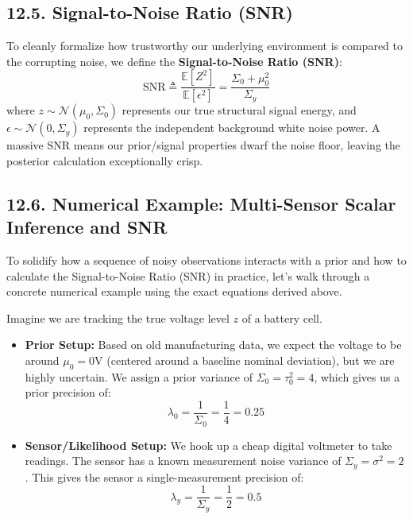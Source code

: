 \documentclass{article}
\begin{document}
\subsection*{12.5. Signal-to-Noise Ratio (SNR)}
To cleanly formalize how trustworthy our underlying environment is compared to the corrupting noise, we define the \textbf{Signal-to-Noise Ratio (SNR)}:
\begin{equation}
\text{SNR} \triangleq \frac{\mathbb{E}[Z^2]}{\mathbb{E}[\epsilon^2]} = \frac{\Sigma_0 + \mu_0^2}{\Sigma_y} \tag{51}
\end{equation}
where $z \sim \mathcal{N}(\mu_0, \Sigma_0)$ represents our true structural signal energy, and $\epsilon \sim \mathcal{N}(0, \Sigma_y)$ represents the independent background white noise power. A massive SNR means our prior/signal properties dwarf the noise floor, leaving the posterior calculation exceptionally crisp.

\subsection*{12.6. Numerical Example: Multi-Sensor Scalar Inference and SNR}

To solidify how a sequence of noisy observations interacts with a prior and how to calculate the Signal-to-Noise Ratio (SNR) in practice, let's walk through a concrete numerical example using the exact equations derived above.

Imagine we are tracking the true voltage level $z$ of a battery cell. 
\begin{itemize}
    \item \textbf{Prior Setup:} Based on old manufacturing data, we expect the voltage to be around $\mu_0 = 0\text{V}$ (centered around a baseline nominal deviation), but we are highly uncertain. We assign a prior variance of $\Sigma_0 = \tau_0^2 = 4$, which gives us a prior precision of:
    \begin{equation*}
    \lambda_0 = \frac{1}{\Sigma_0} = \frac{1}{4} = 0.25
    \end{equation*}
    \item \textbf{Sensor/Likelihood Setup:} We hook up a cheap digital voltmeter to take readings. The sensor has a known measurement noise variance of $\Sigma_y = \sigma^2 = 2$. This gives the sensor a single-measurement precision of:
    \begin{equation*}
    \lambda_y = \frac{1}{\Sigma_y} = \frac{1}{2} = 0.5
    \end{equation*}
\end{itemize}
\end{document}
